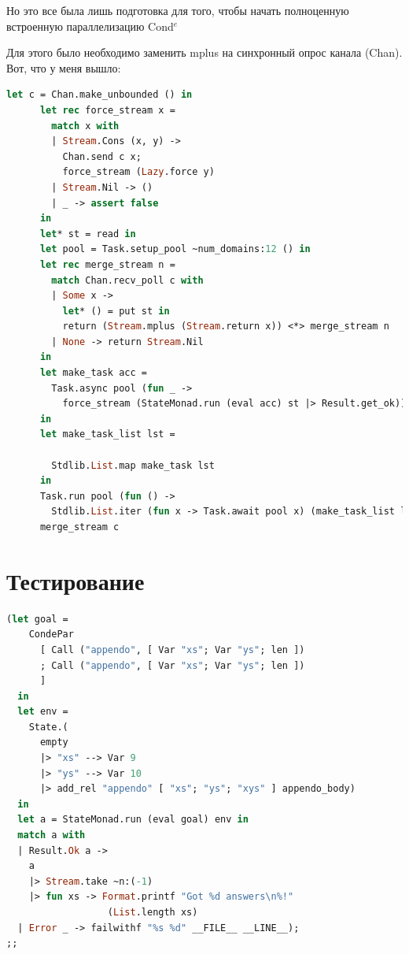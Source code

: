Но это все была лишь подготовка для того, чтобы начать полноценную встроенную параллелизацию Cond$^e$ 

Для этого было необходимо заменить mplus на синхронный опрос канала (Chan). Вот, что у меня вышло:

\begin{lstlisting}[caption=Parallel Cond$^e$, language=OCaml, frame=single]
  let c = Chan.make_unbounded () in
      let rec force_stream x =
        match x with
        | Stream.Cons (x, y) ->
          Chan.send c x;
          force_stream (Lazy.force y)
        | Stream.Nil -> ()
        | _ -> assert false
      in
      let* st = read in
      let pool = Task.setup_pool ~num_domains:12 () in
      let rec merge_stream n =
        match Chan.recv_poll c with
        | Some x ->
          let* () = put st in
          return (Stream.mplus (Stream.return x)) <*> merge_stream n
        | None -> return Stream.Nil
      in
      let make_task acc =
        Task.async pool (fun _ ->
          force_stream (StateMonad.run (eval acc) st |> Result.get_ok))
      in
      let make_task_list lst =

        Stdlib.List.map make_task lst
      in
      Task.run pool (fun () ->
        Stdlib.List.iter (fun x -> Task.await pool x) (make_task_list lst));
      merge_stream c
\end{lstlisting}


\section{Тестирование}

\begin{lstlisting}[caption=Tests, language=OCaml, frame=single]
  (let goal =
    CondePar
      [ Call ("appendo", [ Var "xs"; Var "ys"; len ])
      ; Call ("appendo", [ Var "xs"; Var "ys"; len ])
      ]
  in
  let env =
    State.(
      empty
      |> "xs" --> Var 9
      |> "ys" --> Var 10
      |> add_rel "appendo" [ "xs"; "ys"; "xys" ] appendo_body)
  in
  let a = StateMonad.run (eval goal) env in
  match a with
  | Result.Ok a ->
    a
    |> Stream.take ~n:(-1)
    |> fun xs -> Format.printf "Got %d answers\n%!" 
                  (List.length xs)
  | Error _ -> failwithf "%s %d" __FILE__ __LINE__);
;;
\end{lstlisting}

